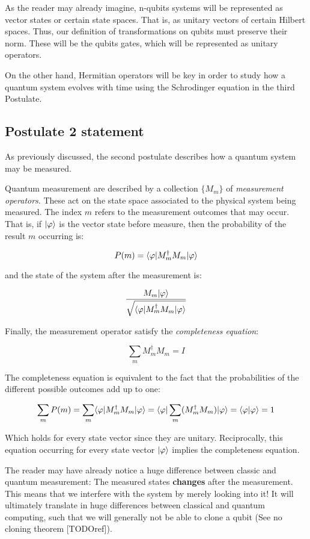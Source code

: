 As the reader may already imagine, n-qubits systems will be represented as vector states or certain state spaces. That is, as unitary vectors of certain Hilbert spaces. Thus, our definition of transformations on qubits must preserve their norm. These will be the qubits gates, which will be represented as unitary operators.

On the other hand, Hermitian operators will be key in order to study how a quantum system evolves with time using the Schrodinger equation in the third Postulate.


\subsection{Postulate 2 statement}


As previously discussed, the second postulate describes how a quantum system may be measured.

\begin{postulate}
	Quantum measurement are described by a collection $\{M_m\}$ of \emph{measurement operators}. These act on the state space associated to the physical system being measured. The index $m$ refers to the measurement outcomes that may occur. That is, if $|\varphi\rangle$ is the vector state before measure, then the probability of the result $m$ occurring is:
	
	$$P(m) = \langle\varphi|M_m^\dagger M_m|\varphi\rangle $$
	
	and the state of the system after the measurement is:
	
	$$ \frac{M_m|\varphi\rangle}{\sqrt{\langle\varphi|M_m^\dagger M_m|\varphi\rangle}}$$
	
	Finally, the measurement operator satisfy the \emph{completeness equation}: 
	
	$$\sum_m M_m^\dagger M_m = I$$
\end{postulate}

The completeness equation is equivalent to the fact that the probabilities of the different possible outcomes add up to one:

$$ \sum_m P(m) = \sum_m \langle\varphi|M_m^\dagger M_m|\varphi\rangle = \langle\varphi|\sum_m (M_m^\dagger M_m)|\varphi\rangle = \langle\varphi|\varphi\rangle = 1 $$

Which holds for every state vector since they are unitary. Reciprocally, this equation occurring for every state vector $|\varphi\rangle$ implies the completeness equation.

The reader may have already notice a huge difference between classic and quantum measurement: The measured states \textbf{changes} after the measurement. This means that we interfere with the system by merely looking into it! It will ultimately translate in huge differences between classical and quantum computing, such that we will generally not be able to clone a qubit (See no cloning theorem [TODOref]).

